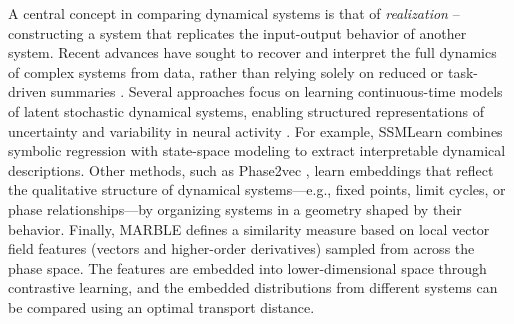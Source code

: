 \documentclass{article}
\newcommand{\ascomment}[1]{\textcolor{ascolor}{(#1)}}
\theoremstyle{definition} \newtheorem{definition}{Definition}  \newtheorem{example}{Example}
\theoremstyle{remark} \newtheorem{remark}{Remark}
\newcounter{ct}
\begin{document}






A central concept in comparing dynamical systems is that of \emph{realization} -- constructing a system that replicates the input-output behavior of another system\citep{grigoryeva2020dimension, gonon2023approximation}.
%
Recent advances have sought to recover and interpret the full dynamics of complex systems from data, rather than relying solely on reduced or task-driven summaries \citep{durstewitz2023reconstructing, brenner2024almost}.
Several approaches focus on learning continuous-time models of latent stochastic dynamical systems, enabling structured representations of uncertainty and variability in neural activity \citep{duncker2019learning}.
For example, SSMLearn \citep{cenedese2022data} combines symbolic regression with state-space modeling to extract interpretable dynamical descriptions.
Other methods, such as Phase2vec \citep{ricci2022phase2vec}, learn embeddings that reflect the qualitative structure of dynamical systems---e.g., fixed points, limit cycles, or phase relationships---by organizing systems in a geometry shaped by their behavior.
Finally, MARBLE\citep{gosztolai2025marble} defines a similarity measure based on local vector field features (vectors and higher-order derivatives) sampled from across the phase space.
The features are embedded into lower-dimensional space through contrastive learning, and the embedded distributions from different systems can be compared using an optimal transport distance\citep{gosztolai2025marble}.
\end{document}
